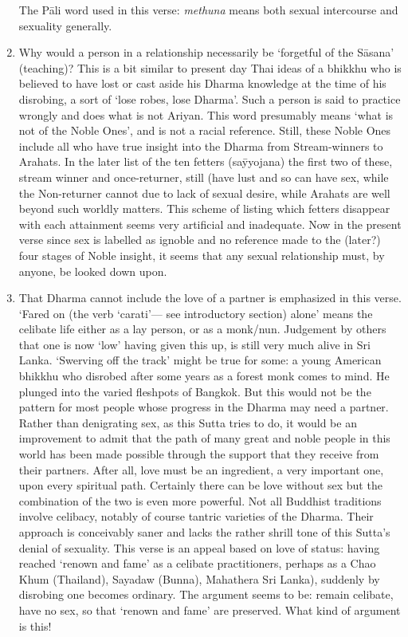 \begin{enumerate}
The P\=ali word used in this verse: \textit{methuna} means both sexual intercourse and sexuality generally.

\item Why would a person in a relationship necessarily be `forgetful of the S\=asana' (teaching)? This is a bit similar to present day Thai ideas of a bhikkhu who is believed to have lost or cast aside his Dharma knowledge at the time of his disrobing, a sort of `lose robes, lose Dharma'. Such a person is said to practice wrongly and does what is not Ariyan. This word presumably means `what is not of the Noble Ones', and is not a racial reference. Still, these Noble Ones include all who have true insight into the Dharma from Stream-winners to Arahats. In the later list of the ten fetters (sa\=yyojana) the first two of these, stream winner and once-returner, still (have lust and so can have sex, while the Non-returner cannot due to lack of sexual desire, while Arahats are well beyond such worldly matters. This scheme of listing which fetters disappear with each attainment seems very artificial and inadequate. Now in the present verse since sex is labelled as ignoble and no reference made to the (later?) four stages of Noble insight, it seems that any sexual relationship must, by anyone, be looked down upon.

\item That Dharma cannot include the love of a partner is emphasized in this verse. `Fared on (the verb `carati'— see introductory section) alone' means the celibate life either as a lay person, or as a monk/nun. Judgement by others that one is now `low' having given this up, is still very much alive in Sri Lanka. `Swerving off the track' might be true for some: a young American bhikkhu who disrobed after some years as a forest monk comes to mind. He plunged into the varied fleshpots of Bangkok. But this would not be the pattern for most people whose progress in the Dharma may need a partner. Rather than denigrating sex, as this Sutta tries to do, it would be an improvement to admit that the path of many great and noble people in this world has been made possible through the support that they receive from their partners. After all, love must be an ingredient, a very important one, upon every spiritual path. Certainly there can be love without sex but the combination of the two is even more powerful. Not all Buddhist traditions involve celibacy, notably of course tantric varieties of the Dharma. Their approach is conceivably saner and lacks the rather shrill tone of this Sutta's denial of sexuality. This verse is an appeal based on love of status: having reached `renown and fame' as a celibate practitioners, perhaps as a Chao Khum (Thailand), Sayadaw (Bunna), Mahathera Sri Lanka), suddenly by disrobing one becomes ordinary. The argument seems to be: remain celibate, have no sex, so that `renown and fame' are preserved. What kind of argument is this!


\end{enumerate}
